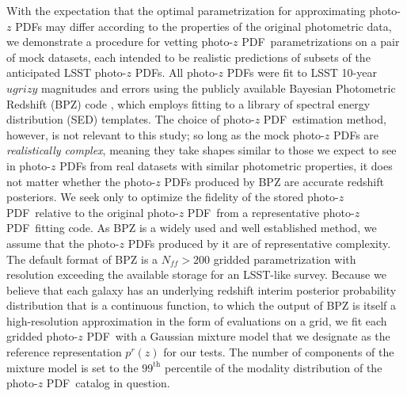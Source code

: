 \documentclass[\docopts]{\docclass}
\newcommand{\pz}{photo-$z$ PDF}
\begin{document}
With the expectation that the optimal parametrization for approximating \pz s 
may differ according to the properties of the original photometric data, we 
demonstrate a procedure for vetting \pz\ parametrizations on a pair of mock 
datasets, each intended to be realistic predictions of subsets of the 
anticipated LSST \pz s.
All \pz s were fit to LSST 10-year $ugrizy$ magnitudes and errors 
\citep{ivezic_lsst:_2008} using the publicly available Bayesian Photometric 
Redshift (BPZ) code \citep{benitez_bayesian_2000}, which employs fitting to a 
library of spectral energy distribution (SED) templates.
The choice of \pz\ estimation method, however, is not relevant to this study; 
so long as the mock \pz s are \textit{realistically complex}, meaning they take 
shapes similar to those we expect to see in \pz s from real datasets with 
similar photometric properties, it does not matter whether the \pz s produced 
by BPZ are accurate redshift posteriors.
We seek only to optimize the fidelity of the stored \pz\ relative to the 
original \pz\ from a representative \pz\ fitting code.
\citep[See][Schmidt, et al.\ in preparation for other work comparing the 
accuracy of \pz s produced by different methods.]{tanaka_photometric_2017, 
jong_third_2017, amaro_metaphor:_2016}
As BPZ is a widely used and well established method, we assume that the \pz s 
produced by it are of representative complexity.
The default format of BPZ is a $N_{ff}>200$ gridded parametrization with 
resolution exceeding the available storage for an LSST-like survey.
Because we believe that each galaxy has an underlying redshift interim 
posterior probability distribution that is a continuous function, to which the 
output of BPZ is itself a high-resolution approximation in the form of 
evaluations on a grid, we fit each gridded \pz\ with a Gaussian mixture model 
that we designate as the reference representation $p^{r}(z)$ for our tests.
The number of components of the mixture model is set to the $99^{\mathrm{th}}$ 
percentile of the modality distribution of the \pz\ catalog in question.
\end{document}
